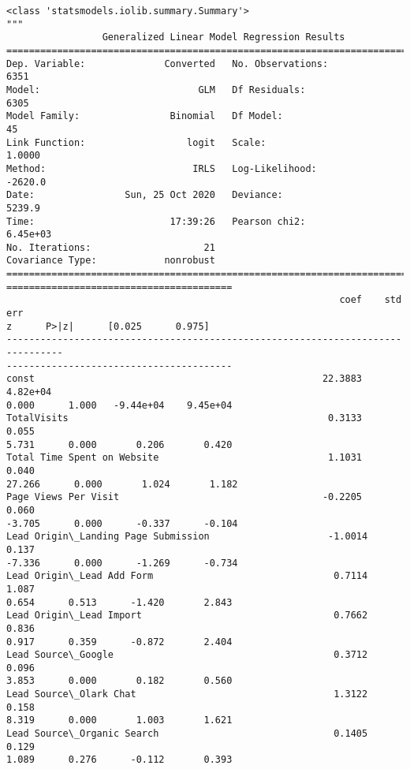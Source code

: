 \documentclass[11pt]{article}
\makeatletter
\newcommand{\boxspacing}{\kern\kvtcb@left@rule\kern\kvtcb@boxsep}
\newcommand{\prompt}[4]{
        \ttfamily\llap{{\color{#2}[#3]:\hspace{3pt}#4}}\vspace{-\baselineskip}
    }
\makeatother
\begin{document}
            \begin{tcolorbox}[breakable, size=fbox, boxrule=.5pt, pad at break*=1mm, opacityfill=0]
\prompt{Out}{outcolor}{72}{\boxspacing}
\begin{Verbatim}[commandchars=\\\{\}]
<class 'statsmodels.iolib.summary.Summary'>
"""
                 Generalized Linear Model Regression Results
==============================================================================
Dep. Variable:              Converted   No. Observations:                 6351
Model:                            GLM   Df Residuals:                     6305
Model Family:                Binomial   Df Model:                           45
Link Function:                  logit   Scale:                          1.0000
Method:                          IRLS   Log-Likelihood:                -2620.0
Date:                Sun, 25 Oct 2020   Deviance:                       5239.9
Time:                        17:39:26   Pearson chi2:                 6.45e+03
No. Iterations:                    21
Covariance Type:            nonrobust
================================================================================
========================================
                                                           coef    std err
z      P>|z|      [0.025      0.975]
--------------------------------------------------------------------------------
----------------------------------------
const                                                   22.3883   4.82e+04
0.000      1.000   -9.44e+04    9.45e+04
TotalVisits                                              0.3133      0.055
5.731      0.000       0.206       0.420
Total Time Spent on Website                              1.1031      0.040
27.266      0.000       1.024       1.182
Page Views Per Visit                                    -0.2205      0.060
-3.705      0.000      -0.337      -0.104
Lead Origin\_Landing Page Submission                     -1.0014      0.137
-7.336      0.000      -1.269      -0.734
Lead Origin\_Lead Add Form                                0.7114      1.087
0.654      0.513      -1.420       2.843
Lead Origin\_Lead Import                                  0.7662      0.836
0.917      0.359      -0.872       2.404
Lead Source\_Google                                       0.3712      0.096
3.853      0.000       0.182       0.560
Lead Source\_Olark Chat                                   1.3122      0.158
8.319      0.000       1.003       1.621
Lead Source\_Organic Search                               0.1405      0.129
1.089      0.276      -0.112       0.393

\end{Verbatim}
\end{tcolorbox}
\end{document}
